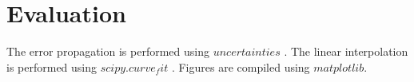 \section{Evaluation}
\label{sec:auswertung}


The error propagation is performed using $uncertainties$ \cite{uncertainties}. The linear interpolation is performed using $scipy.curve_fit$ \cite{scipy}.
Figures are compiled using $matplotlib$\cite{matplotlib}. 
%